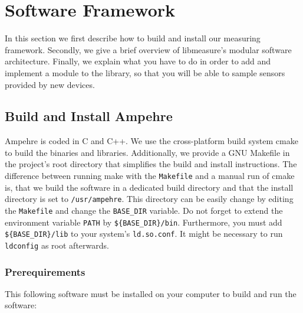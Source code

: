 %
%
%
%
%
%

\section{Software Framework}\label{sec:SoftwareArchitecture}

In this section we first describe how to build and install our measuring framework. Secondly, we give a brief overview of libmeasure's modular software architecture. Finally, we explain what you have to do in order to add and implement a module to the library, so that you will be able to sample sensors provided by new devices.

\subsection{Build and Install Ampehre}
Ampehre is coded in C and C++. We use the cross-platform build system cmake to build the binaries and libraries. Additionally, we provide a GNU Makefile in the project's root directory that simplifies the build and install instructions. The difference between running make with the \texttt{Makefile} and a manual run of cmake is, that we build the software in a dedicated build directory and that the install directory is set to \texttt{/usr/ampehre}. This directory can be easily change by editing the \texttt{Makefile} and change the \texttt{BASE\_DIR} variable. Do not forget to extend the environment variable \texttt{PATH} by \texttt{\$\{BASE\_DIR\}/bin}. Furthermore, you must add \texttt{\$\{BASE\_DIR\}/lib} to your system's \texttt{ld.so.conf}. It might be necessary to run \texttt{ldconfig} as root afterwards.

\subsubsection{Prerequirements}
This following software must be installed on your computer to build and run the software:

